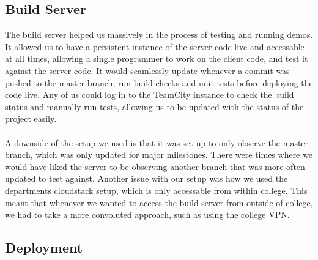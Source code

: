 \documentclass{article}
\begin{document}
\subsection{Build Server}
The build server helped us massively in the process of testing and running demos. It allowed us to have a persistent instance of the server code live and accessable at all times, allowing a single programmer to work on the client code, and test it against the server code. It would seamlessly update whenever a commit was pushed to the master branch, run build checks and unit tests before deploying the code live. Any of us could log in to the TeamCity instance to check the build status and manually run tests, allowing us to be updated with the status of the project easily.
\\\\
A downside of the setup we used is that it was set up to only observe the master branch, which was only updated for major milestones. There were times where we would have liked the server to be observing another branch that was more often updated to test against. Another issue with our setup was how we used the departments cloudstack setup, which is only accessable from within college. This meant that whenever we wanted to access the build server from outside of college, we had to take a more convoluted approach, such as using the college VPN.

\subsection{Deployment} %
\end{document}
